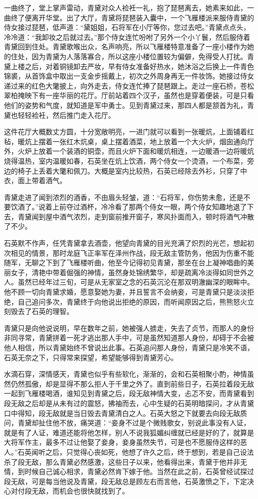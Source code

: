 一曲终了，堂上掌声雷动，青黛对众人裣衽一礼，抱了琵琶离去，她素来如此，一曲终了便离开华堂。出了大厅，青黛将琵琶装入囊中，一个飞雁楼派来服侍青黛的侍女接过琵琶，低声道：“黛姐姐，石将军在小厅等你，您过去吧。”青黛点点头，冷冷道：“我卸妆之后就过去。”那个侍女连忙吩咐了另外一个小丫鬟，然后服侍着青黛回到住处。青黛歌喉出众，名声响亮，所以飞雁楼特意准备了一座小楼作为她的住处，因为青黛为人落落寡合，所以这座小楼位置较为偏僻，免得受人打扰。青黛上楼之后，对着铜镜卸去严妆，早有侍女准备好热水，她沐浴之后换上一件青色锦裘，从首饰盒中取出一支金步摇戴上，初次之外周身再无一件妆饰。她接过侍女递过来的红色大氅披上，向外走去，侍女连忙捧了琵琶跟上。走过一座石桥，苍松翠柏掩映下有一座华丽的花厅。厅前站着四个汉子，虽然也是穿着便装，可是只看他们的姿势和气度，就知道是军中勇士。见到青黛过来，那四人都是颔首为礼，青黛也轻轻裣衽，然后推门走入花厅。

这件花厅大概数丈方圆，十分宽敞明亮，一进门就可以看到一张暖炕，上面铺着红毡，暖炕上摆着一张红木炕桌，桌上摆着酒菜，地上放着一个大火炉，烟囱通向厅外，火炉上放着一个装酒的铜壶，而且火炉下面和暖炕相连，一边暖酒一边将暖炕烧得温热，室内温暖如春，石英坐在炕上饮酒，两个侍女一个烫酒，一个布菜，旁边的椅子上丢着大氅和佩刀。大概是室内比较热，石英已经除去外衫，只穿了中衣，面上带着酒气。

青黛走进了闻到浓烈的酒香，不由眉头轻皱，道：“石将军，你伤势未愈，还是不要饮酒了。”说着上前夺过酒杯，冷冷看了那两个侍女一眼，两个侍女知趣地退了下去，青黛闻到屋中酒气浓烈，走到窗前推开窗子，寒风扑面而入，顿时将酒气冲散了不少。

石英默不作声，任凭青黛拿去酒壶，他望向青黛的目光充满了炽烈的光芒，想起初次相见的情景，那时龙庭飞正率军在泽州作战，段无敌主管防务，他因为伤重不能随军，无聊之下到了飞雁楼听曲，他至今记得初见青黛，那坐在台上凝神唱曲的美丽女子，清艳中带着倔强的神情，虽然身处锦绣繁华，却是疏离冷淡得如同世外之人。虽然已经年过三旬，可是从无家室之念的石英沉沦在那双明澈幽深的眼眸中。他不顾一切向青黛求婚，愿意娶她为妻，并且誓言不会纳妾，可是青黛只是淡淡拒绝，自己追问多次，青黛终于向他说出拒绝的原因，而听闻原因之后，熊熊怒火立刻毁去了石英的理智。

青黛只是向他说说明，早在数年之前，她被强人掳走，失去了贞节，而那人的身份非同寻常，青黛拼着一死才逃出那人手中，可是虽然知道那人身份，却碍于不会被他人相信，所以青黛始终不曾说出此事。石英追问那人身份，青黛只是冷笑不语，石英无奈之下，只得常来探望，希望能够得到青黛芳心。

水滴石穿，深情感天，青黛也似乎有些软化，渐渐的，会和石英相聚小酌，神情虽然仍然孤傲，却是显得不那么拒人于千里之外了。直到前些日子，石英拉着段无敌一起到飞雁楼喝酒，谁知见到青黛之后，段无敌神情大变，忐忑不安，而青黛看到段无敌之后却是从未有过的震怒，拂袖而去，心中生疑的石英明暗探问，才从青黛口中得知，段无敌就是当日毁去青黛清白之人。石英大怒之下就要去向段无敌质问，青黛却扯住他不放，痛哭道：“妾身不过是个微贱歌女，别说此事没有人证，就是有了人证，难道还能将他怎样，别人不说我狐媚纠缠就已经是好的了，就算是大将军作主，最多不过让他娶了妾身，妾身虽然失节，可是也不愿服侍这样的恶人。”石英闻听之后，只觉得心丧如死，他想了许久之后，终于想到，若是自己设法杀了段无敌，那么青黛必然感激，这些日子以来，他看得出来，青黛于他并非无情，到时候自己诚心相求，青黛必然肯下嫁于他。当然在此之前，石英曾经试探过段无敌，可是每当他说及青黛，段无敌总是顾左右而言他，石英激愤之下，下定决心对付段无敌，而机会也很快就找到了。

